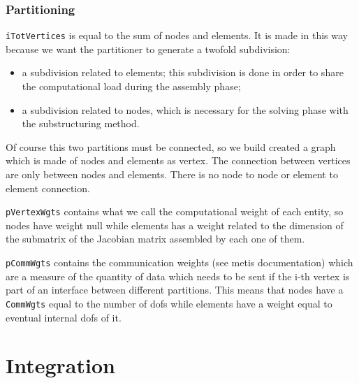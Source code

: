 \documentclass[10pt,dvips,fleqn]{report}
\begin{document}
\subsection{Partitioning}
\texttt{iTotVertices} is equal to the sum of nodes and elements. 
It is made in this way because we want the partitioner 
to generate a twofold subdivision:
\begin{itemize}
\item a subdivision related to elements; 
this subdivision is done in order to share the computational 
load during the assembly phase;
\item a subdivision related to nodes, 
which is necessary for the solving phase with the substructuring method.
\end{itemize}
Of course this two partitions must be connected, 
so we build created a graph which is made of nodes and elements as vertex. 
The connection between vertices are only between nodes and elements. 
There is no node to node or element to element connection.

\texttt{pVertexWgts} 
contains what we call the computational weight of each entity, 
so nodes have weight null while elements has a weight related to 
the dimension of the submatrix of the Jacobian matrix assembled
by each one of them.

\texttt{pCommWgts} contains the communication weights 
(see metis documentation) which are a measure of the quantity 
of data which needs to be sent if the i-th vertex is part 
of an interface between different partitions. 
This means that nodes have a \texttt{CommWgts} equal to the number 
of dofs while elements have a weight equal to eventual internal dofs of it.


\chapter{Integration}
\end{document}
